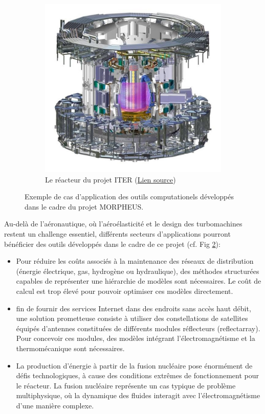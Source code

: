 \documentclass[french]{article}
\begin{document}
\begin{figure}[t]
\begin{subfigure}[t]{0.25\textwidth}
		\includegraphics[width=\columnwidth]{tcws.jpg}%
		\caption{Le réacteur du projet ITER (\href{https://www.iter.org/newsline/-/1119}{Lien source})}
		\label{fig:sofi-mit}
	\end{subfigure}
	\caption[]{Exemple de cas d’application des outils computationels développés dans le cadre du projet MORPHEUS.}%
	\label{fig:applications}%
\end{figure}

Au-delà de l’aéronautique, où l’aéroélasticité et le design des turbomachines restent un challenge essentiel, différents secteurs d’applications pourront bénéficier des outils développés
dans le cadre de ce projet (cf. Fig \ref{fig:applications}): \\
\begin{itemize}
	\item Pour réduire les coûts associés à la maintenance des réseaux de distribution (énergie
	électrique, gas, hydrogène ou hydraulique), des méthodes structurées capables de représenter une hiérarchie de modèles sont nécessaires. Le coût de calcul est trop élevé pour pouvoir optimiser ces modèles directement.
	\item fin de fournir des services Internet dans des endroits sans accès haut débit, une
	solution prometteuse consiste à utiliser des constellations de satellites équipés d'antennes constituées de différents modules réflecteurs (reflectarray). Pour concevoir ces modules, des modèles intégrant l’électromagnétisme et la thermomécanique sont nécessaires.
	\item  La production d’énergie à partir de la fusion nucléaire pose énormément de défis
	technologiques, à cause des conditions extrêmes de fonctionnement pour le réacteur. La fusion nucléaire représente un cas typique de problème multiphysique, où la dynamique des fluides interagit avec l’électromagnétisme d’une manière complexe.
\end{itemize}
\end{document}
